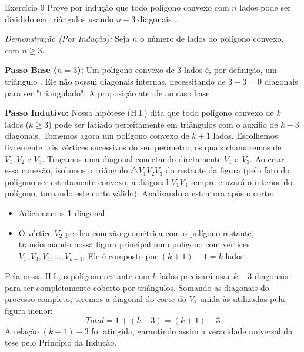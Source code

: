 \documentclass[a4paper,11pt]{article}
\theoremstyle{definition}
\theoremstyle{plain}
\theoremstyle{remark}
\newcounter{questao}[section]
\begin{document}
\newpage \begin{questaoManually}{Exercício 9}
Prove por indução que todo polígono convexo com $n$ lados pode ser dividido em triângulos usando $n - 3$ diagonais .

\textit{Demonstração (Por Indução):}
Seja $n$ o número de lados do polígono convexo, com $n \ge 3$.

\textbf{Passo Base ($n=3$):}
Um polígono convexo de 3 lados é, por definição, um triângulo . Ele não possui diagonais internas, necessitando de $3 - 3 = 0$ diagonais para ser "triangulado". A proposição atende ao caso base.

\textbf{Passo Indutivo:}
Nossa hipótese (H.I.) dita que todo polígono convexo de $k$ lados ($k \ge 3$) pode ser fatiado perfeitamente em triângulos com o auxílio de $k - 3$ diagonais.
Tomemos agora um polígono convexo de $k+1$ lados. Escolhemos livremente três vértices sucessivos do seu perímetro, os quais chamaremos de $V_1, V_2$ e $V_3$. Traçamos uma diagonal conectando diretamente $V_1$ a $V_3$. 
Ao criar essa conexão, isolamos o triângulo $\triangle V_1 V_2 V_3$ do restante da figura (pelo fato do polígono ser estritamente convexo, a diagonal $V_1V_3$ sempre cruzará o interior do polígono, tornando este corte válido).
Analisando a estrutura após o corte:
\begin{itemize}
    \item Adicionamos \textbf{1} diagonal.
    \item O vértice $V_2$ perdeu conexão geométrica com o polígono restante, transformando nossa figura principal num polígono com vértices $V_1, V_3, V_4, \dots, V_{k+1}$. Ele é composto por $(k+1) - 1 = k$ lados.
\end{itemize}
Pela nossa H.I., o polígono restante com $k$ lados precisará usar $k - 3$ diagonais para ser completamente coberto por triângulos.
Somando as diagonais do processo completo, teremos a diagonal do corte do $V_2$ unida às utilizadas pela figura menor:
\begin{equation}
Total = 1 + (k - 3) = (k + 1) - 3
\end{equation}
A relação $(k+1)-3$ foi atingida, garantindo assim a veracidade universal da tese pelo Princípio da Indução. \blacksquare

\end{questaoManually}
\end{document}
